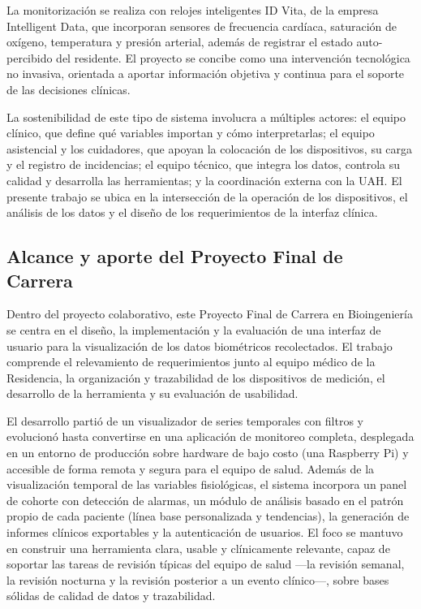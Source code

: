 \documentclass[12pt,a4paper]{article}
\begin{document}
    La monitorización se realiza con relojes inteligentes ID Vita, de la empresa Intelligent Data, que incorporan sensores de frecuencia cardíaca, saturación de oxígeno, temperatura y presión arterial, además de registrar el estado auto-percibido del residente. El proyecto se concibe como una intervención tecnológica no invasiva, orientada a aportar información objetiva y continua para el soporte de las decisiones clínicas.

    La sostenibilidad de este tipo de sistema involucra a múltiples actores: el equipo clínico, que define qué variables importan y cómo interpretarlas; el equipo asistencial y los cuidadores, que apoyan la colocación de los dispositivos, su carga y el registro de incidencias; el equipo técnico, que integra los datos, controla su calidad y desarrolla las herramientas; y la coordinación externa con la UAH. El presente trabajo se ubica en la intersección de la operación de los dispositivos, el análisis de los datos y el diseño de los requerimientos de la interfaz clínica.

    \subsection{Alcance y aporte del Proyecto Final de Carrera}
    Dentro del proyecto colaborativo, este Proyecto Final de Carrera en Bioingeniería se centra en el diseño, la implementación y la evaluación de una interfaz de usuario para la visualización de los datos biométricos recolectados. El trabajo comprende el relevamiento de requerimientos junto al equipo médico de la Residencia, la organización y trazabilidad de los dispositivos de medición, el desarrollo de la herramienta y su evaluación de usabilidad.
    
    El desarrollo partió de un visualizador de series temporales con filtros y evolucionó hasta convertirse en una aplicación de monitoreo completa, desplegada en un entorno de producción sobre hardware de bajo costo (una Raspberry Pi) y accesible de forma remota y segura para el equipo de salud. Además de la visualización temporal de las variables fisiológicas, el sistema incorpora un panel de cohorte con detección de alarmas, un módulo de análisis basado en el patrón propio de cada paciente (línea base personalizada y tendencias), la generación de informes clínicos exportables y la autenticación de usuarios. El foco se mantuvo en construir una herramienta clara, usable y clínicamente relevante, capaz de soportar las tareas de revisión típicas del equipo de salud —la revisión semanal, la revisión nocturna y la revisión posterior a un evento clínico—, sobre bases sólidas de calidad de datos y trazabilidad.
\end{document}
